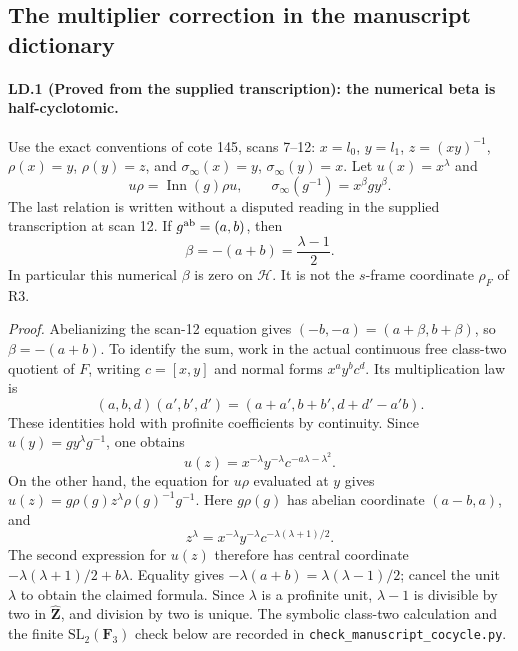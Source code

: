 
\subsection{The multiplier correction in the manuscript dictionary}

\paragraph{LD.1 (Proved from the supplied transcription): the numerical beta is half-cyclotomic.}
Use the exact conventions of cote 145, scans 7--12:
$x=l_0$, $y=l_1$, $z=(xy)^{-1}$,
$\rho(x)=y$, $\rho(y)=z$, and
$\sigma_\infty(x)=y$, $\sigma_\infty(y)=x$.
Let $u(x)=x^\lambda$ and
\[
 u\rho=\operatorname{Inn}(g)\rho u,
 \qquad
 \sigma_\infty(g^{-1})=x^\beta g y^\beta.
\]
The last relation is written without a disputed reading in the
supplied transcription at scan 12. If $g^{\rm ab}=(a,b)$,
then
\[
 \beta=-(a+b)=\frac{\lambda-1}{2}.
\]
In particular this numerical $\beta$ is zero on $\mathcal H$.
It is not the $s$-frame coordinate $\rho_F$ of R3.

\emph{Proof.}
Abelianizing the scan-12 equation gives
$(-b,-a)=(a+\beta,b+\beta)$, so $\beta=-(a+b)$.
To identify the sum, work in the actual continuous free
class-two quotient of $F$, writing $c=[x,y]$ and normal forms
$x^ay^bc^d$. Its multiplication law is
\[
 (a,b,d)(a',b',d')=(a+a',b+b',d+d'-a'b).
\]
These identities hold with profinite coefficients by continuity.
Since $u(y)=gy^\lambda g^{-1}$, one obtains
\[
 u(z)=x^{-\lambda}y^{-\lambda}
                        c^{-a\lambda-\lambda^2}.
\]
On the other hand, the equation for $u\rho$ evaluated at $y$
gives $u(z)=g\rho(g)z^\lambda\rho(g)^{-1}g^{-1}$.
Here $g\rho(g)$ has abelian coordinate $(a-b,a)$, and
\[
 z^\lambda=x^{-\lambda}y^{-\lambda}
                         c^{-\lambda(\lambda+1)/2}.
\]
The second expression for $u(z)$ therefore has central
coordinate $-\lambda(\lambda+1)/2+b\lambda$.
Equality gives
$-\lambda(a+b)=\lambda(\lambda-1)/2$; cancel the unit
$\lambda$ to obtain the claimed formula. Since $\lambda$
is a profinite unit, $\lambda-1$ is divisible by two in
$\widehat{\mathbf Z}$, and division by two is unique.
The symbolic class-two calculation and the finite
$\mathrm{SL}_2(\mathbf F_3)$ check below are recorded in
\texttt{check\_manuscript\_cocycle.py}.

